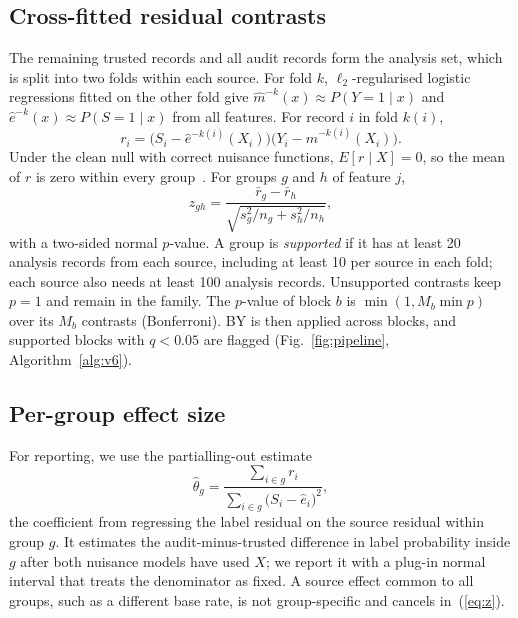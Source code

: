 \documentclass[conference]{IEEEtran}
\begin{document}
\subsection{Cross-fitted residual contrasts}
The remaining trusted records and all audit records form the analysis set, which is split into two folds within each source. For fold $k$, $\ell_2$-regularised logistic regressions fitted on the other fold give $\hat m^{-k}(x)\approx P(Y{=}1\mid x)$ and $\hat e^{-k}(x)\approx P(S{=}1\mid x)$ from all features. For record $i$ in fold $k(i)$,
\begin{equation}
r_i=\bigl(S_i-\hat e^{-k(i)}(X_i)\bigr)\bigl(Y_i-\hat m^{-k(i)}(X_i)\bigr).
\label{eq:r}
\end{equation}
Under the clean null with correct nuisance functions, $E[r\mid X]=0$, so the mean of $r$ is zero within every group~\cite{shah2020hardness}. For groups $g$ and $h$ of feature $j$,
\begin{equation}
z_{gh}=\frac{\bar r_g-\bar r_h}{\sqrt{s_g^2/n_g+s_h^2/n_h}},
\label{eq:z}
\end{equation}
with a two-sided normal $p$-value. A group is \emph{supported} if it has at least 20 analysis records from each source, including at least 10 per source in each fold; each source also needs at least 100 analysis records. Unsupported contrasts keep $p=1$ and remain in the family. The $p$-value of block $b$ is $\min(1, M_b\min p)$ over its $M_b$ contrasts (Bonferroni). BY is then applied across blocks, and supported blocks with $q<0.05$ are flagged (Fig.~\ref{fig:pipeline}, Algorithm~\ref{alg:v6}).

\subsection{Per-group effect size}
For reporting, we use the partialling-out estimate~\cite{robinson1988root}
\begin{equation}
\hat\theta_g=\frac{\sum_{i\in g} r_i}{\sum_{i\in g}\bigl(S_i-\hat e_i\bigr)^2},
\label{eq:theta}
\end{equation}
the coefficient from regressing the label residual on the source residual within group $g$. It estimates the audit-minus-trusted difference in label probability inside $g$ after both nuisance models have used $X$; we report it with a plug-in normal interval that treats the denominator as fixed. A source effect common to all groups, such as a different base rate, is not group-specific and cancels in~(\ref{eq:z}).
\end{document}
